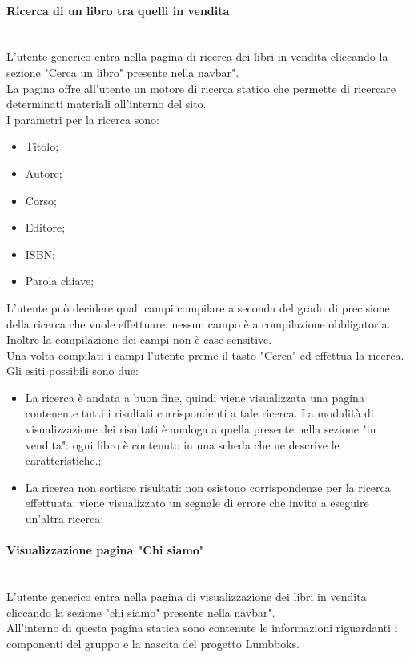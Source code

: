 \paragraph{Ricerca di un libro tra quelli in vendita}\mbox{}\\
\label{par:RicercaLibro}
L'utente generico entra nella pagina di ricerca dei libri in vendita cliccando la sezione "Cerca un libro" presente nella navbar".\\
La pagina offre all'utente un motore di ricerca statico che permette di ricercare determinati materiali all'interno del sito.\\
I parametri per la ricerca sono:
\begin{itemize}
	\item Titolo;
	\item Autore;
	\item Corso;
	\item Editore;
	\item ISBN;
	\item Parola chiave;
\end{itemize}
L'utente può decidere quali campi compilare a seconda del grado di precisione della ricerca che vuole effettuare: nessun campo è a compilazione obbligatoria. Inoltre la compilazione dei campi non è case sensitive.\\
Una volta compilati i campi l'utente preme il tasto "Cerca" ed effettua la ricerca. Gli esiti possibili sono due:
\begin{itemize}
	\item La ricerca è andata a buon fine, quindi viene visualizzata una pagina contenente tutti i risultati corrispondenti a tale ricerca. La modalità di visualizzazione dei risultati è analoga a quella presente nella sezione "in vendita": ogni libro è contenuto in una scheda che ne descrive le caratteristiche.;
	\item La ricerca non sortisce risultati: non esistono corrispondenze per la ricerca effettuata: viene visualizzato un segnale di errore che invita a eseguire un'altra ricerca;
	
\end{itemize}

\paragraph{Visualizzazione pagina "Chi siamo"}\mbox{}\\
\label{par:VisAbout}
L'utente generico entra nella pagina di visualizzazione dei libri in vendita cliccando la sezione "chi siamo" presente nella navbar".\\
All'interno di questa pagina statica sono contenute le informazioni riguardanti i componenti del gruppo e la nascita del progetto Lumbboks.

